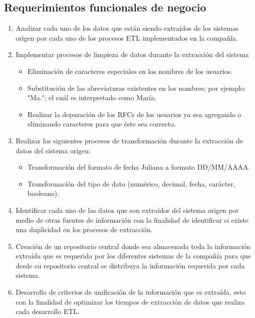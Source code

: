\subsection{Requerimientos funcionales de negocio}

\begin{enumerate}

\item Analizar cada uno de los datos que están siendo extraídos de los sistemas
  origen por cada uno de los procesos ETL implementados en la compañía.

\item Implementar procesos de limpieza de datos durante la extracción del
  sistema

  \begin {itemize}
  \item Eliminación de caracteres especiales en los nombres de los usuarios.
  \item Substitución de las abreviaturas existentes en los nombres; por ejemplo:
    "Ma."; el cuál es interpretado como María.
  \item Realizar la depuración de los RFCs de los usuarios ya sea agregando o
    eliminando caracteres para que éste sea correcto.
  \end{itemize}

\item Realizar los siguientes procesos de transformación durante la extracción
  de datos del sistema origen:

  \begin {itemize}
  \item Transformación del formato de fecha Juliana a formato DD/MM/AAAA.
  \item Transformación del tipo de dato (numérico, decimal, fecha, carácter,
    booleano).
  \end{itemize}

\item Identificar cada uno de las datos que son extraídos del sistema origen por
  medio de otras fuentes de información con la finalidad de identificar si
  existe una duplicidad en los procesos de extracción.

\item Creación de un repositorio central donde sea almacenada toda la
  información extraída que es requerida por los diferentes sistemas de la
  compañía para que desde su repositorio central se distribuya la información
  requerida por cada sistema.

\item Desarrollo de criterios de unificación de la información que es extraída,
  esto con la finalidad de optimizar los tiempos de extracción de datos que
  realiza cada desarrollo ETL.


\end{enumerate}
